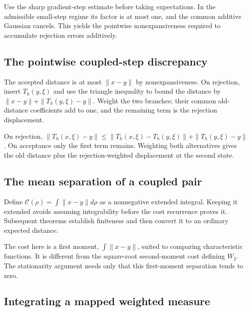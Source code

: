 \documentclass[11pt,a4paper]{report}
\begin{document}
Use the sharp gradient-step estimate before taking expectations. In the admissible small-step regime its factor is at most one, and the common additive Gaussian cancels. This yields the pointwise nonexpansiveness required to accumulate rejection errors additively.

\subsection{\texorpdfstring{The pointwise coupled-step discrepancy}{The pointwise coupled-step discrepancy}}
\label{report-step-UnadjustedLangevin-MALACoupling-lean-19}


The accepted distance is at most \(\|x-y\|\) by nonexpansiveness. On rejection, insert \(T_h(y,\xi)\) and use the triangle inequality to bound the distance by \(\|x-y\|+\|T_h(y,\xi)-y\|\). Weight the two branches; their common old-distance coefficients add to one, and the remaining term is the rejection displacement.



On rejection, \(\|T_h(x,\xi)-y\|\le\|T_h(x,\xi)-T_h(y,\xi)\|+\|T_h(y,\xi)-y\|\). On acceptance only the first term remains. Weighting both alternatives gives the old distance plus the rejection-weighted displacement at the second state.

\subsection{\texorpdfstring{The mean separation of a coupled pair}{The mean separation of a coupled pair}}
\label{report-step-UnadjustedLangevin-MALACoupling-lean-20}


Define \(\mathcal C(\rho)=\int\|x-y\|d\rho\) as a nonnegative extended integral. Keeping it extended avoids assuming integrability before the cost recurrence proves it. Subsequent theorems establish finiteness and then convert it to an ordinary expected distance.



The cost here is a first moment, \(\int\|x-y\|\), suited to comparing characteristic functions. It is different from the square-root second-moment cost defining \(W_2\). The stationarity argument needs only that this first-moment separation tends to zero.

\subsection{\texorpdfstring{Integrating a mapped weighted measure}{Integrating a mapped weighted measure}}
\label{report-step-UnadjustedLangevin-MALACoupling-lean-21}
\end{document}
